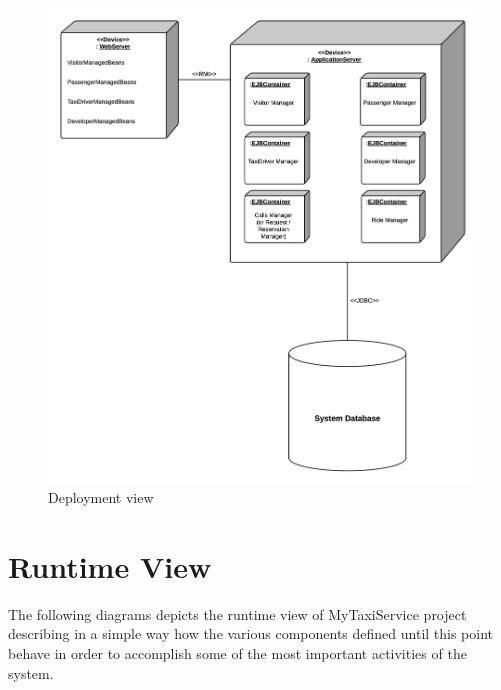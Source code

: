 \begin{figure}[htbp]
\centering
\includegraphics[width=\textwidth]{cpt/img/RuntimeDeploymentView}
\caption{Deployment view}
\label{fig:Deploy}
\end{figure}
\clearpage

\section{Runtime View}
The following diagrams depicts the runtime view of MyTaxiService project describing in a simple way how the various components defined until this point behave in order to accomplish some of the most important activities of the system.

